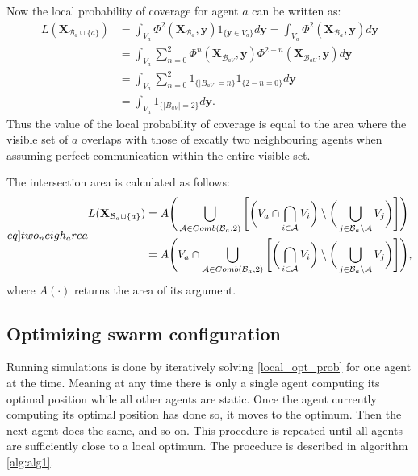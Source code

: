 Now the local probability of coverage for agent $a$ can be written as:
\begin{equation}
  \begin{split}
    L(\mathbf{X}_{\mathcal{B}_{a}\cup\{a\}}) &= \int_{V_{a}}\Phi^{2}(\mathbf{X}_{\mathcal{B}_{a}}, \mathbf{y})1_{\{\mathbf{y}\in V_{a}\}}d\mathbf{y} = \int_{V_{a}}\Phi^{2}(\mathbf{X}_{\mathcal{B}_{a}}, \mathbf{y})d\mathbf{y}\\
    &= \int_{V_{a}}\sum_{n = 0}^{2} \Phi^{n}(\mathbf{X}_{\mathcal{B}_{a V}}, \mathbf{y})\Phi^{2-n}(\mathbf{X}_{\mathcal{B}_{a U}},\mathbf{y})d\mathbf{y}\\
    &= \int_{V_{a}}\sum_{n = 0}^{2}1_{\{|B_{a V}| = n\}}1_{\{2-n = 0\}}d\mathbf{y}\\
    &= \int_{V_{a}}1_{\{|B_{a V}| = 2\}}d\mathbf{y}.
  \end{split}
\end{equation}
Thus the value of the local probability of coverage is equal to the area where the visible set of $a$ overlaps with those of excatly two neighbouring agents when assuming perfect communication within the entire visible set.

The intersection area is calculated as follows:
\begin{equation}\label[eq]{two_neigh_area}
  \begin{split}
    L(\mathbf{X}_{\mathcal{B}_{a}\cup\{a\}}) &= A\Biggr(\bigcup_{\mathcal{A}\in Comb(\mathcal{B}_{a}, 2)}\Bigg[\bigg(V_{a}\cap \bigcap_{i\in\mathcal{A}}V_{i}\bigg)\setminus\bigg(\bigcup_{j\in\mathcal{B}_{a}\setminus\mathcal{A}}V_{j}\bigg)\Bigg]\Biggr)\\
    &= A\Biggr(V_{a}\cap\bigcup_{\mathcal{A}\in Comb(\mathcal{B}_{a}, 2)}\Bigg[\bigg(\bigcap_{i\in\mathcal{A}}V_{i}\bigg)\setminus\bigg(\bigcup_{j\in\mathcal{B}_{a}\setminus\mathcal{A}}V_{j}\bigg)\Bigg]\Biggr),
  \end{split}
\end{equation}
where $A(\cdot)$ returns the area of its argument.
\subsection{Optimizing swarm configuration}
Running simulations is done by iteratively solving \eqref{local_opt_prob} for one agent at the time. Meaning at any time there is only
a single agent computing its optimal position while all other agents are static. Once the agent currently computing its optimal position
has done so, it moves to the optimum. Then the next agent does the same, and so on. This procedure is repeated
until all agents are sufficiently close to a local optimum. The procedure is described in algorithm \ref{alg:alg1}.

